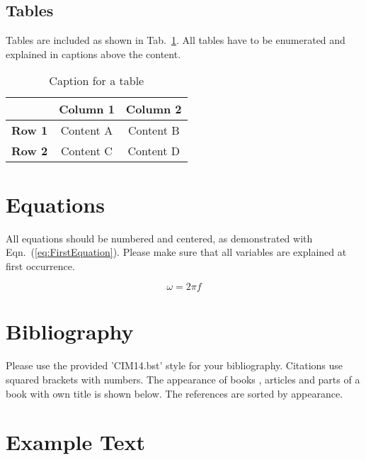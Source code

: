 \documentclass[a4paper, twocolumn]{article}
\begin{document}
\subsection{Tables}

Tables are included as shown in Tab.~\ref{tab:DescriptiveTextForATable}.
%
All tables have to be enumerated and explained in captions above the content.


\begin{table}[htbp]
    \centering
    \caption{Caption for a table}
    \label{tab:DescriptiveTextForATable}
        \begin{tabular}{l|cc}
          & \bfseries Column 1 & \bfseries Column 2\\
          \hline
       \bfseries Row 1 & Content A & Content B  \\
       \bfseries  Row 2 & Content C  & Content D  \\
        \end{tabular}
    \end{table}



\section{Equations}

All equations should be numbered and centered, as demonstrated with Eqn.~(\ref{eq:FirstEquation}).
%
Please make sure that all variables are explained at first occurrence.


\begin{equation}
\label{eq:FirstEquation}
            \omega = 2 \pi f
\end{equation}


\section{Bibliography}
 
Please use the provided 'CIM14.bst' style for your bibliography.
%
Citations use squared brackets with numbers.
%
The appearance of books \cite{Dahlhaus1990},
articles \cite{Zwicker1961}
and parts of a book with own title \cite{Butler2002}
is shown below.
%
The references are sorted by appearance.



\section{Example Text}
 
\end{document}
